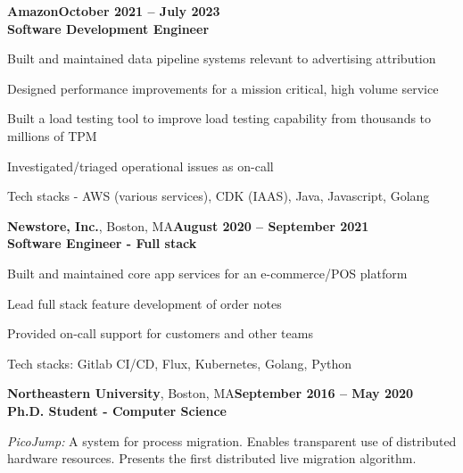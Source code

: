 \documentclass[margin,line]{resume}
\begin{document}
\begin{resume}
\textbf{Amazon}\hfill\textbf{October 2021 -- July 2023}\\
\textbf{Software Development Engineer}\hfill
\vspace{-3mm}\\\vspace{-1mm}
\begin{list2}
    \item Built and maintained data pipeline systems relevant to advertising attribution
    \item Designed performance improvements for a mission critical, high volume service
    \item Built a load testing tool to improve load testing capability from thousands to millions of TPM
    \item Investigated/triaged operational issues as on-call
    \item Tech stacks - AWS (various services), CDK (IAAS), Java, Javascript, Golang
\end{list2}


\textbf{Newstore, Inc.}, Boston, MA\hfill\textbf{August 2020 -- September 2021}\\
\textbf{Software Engineer - Full stack}\hfill
\vspace{-3mm}\\\vspace{-1mm}
\begin{list2}
	\item Built and maintained core app services for an e-commerce/POS platform
    \item Lead full stack feature development of order notes
    \item Provided on-call support for customers and other teams
    \item Tech stacks: Gitlab CI/CD, Flux, Kubernetes, Golang, Python
\end{list2}

\textbf{Northeastern University}, Boston, MA\hfill\textbf{September 2016 -- May 2020}\\
\textbf{Ph.D. Student - Computer Science}\hfill 
\vspace{-3mm}\\\vspace{-1mm}
\begin{list2}
	\item \filbreak\textit{PicoJump:} A system for process migration. Enables transparent use of distributed hardware resources. Presents the first distributed live migration algorithm.
\end{list2}


\end{resume}
\end{document}
